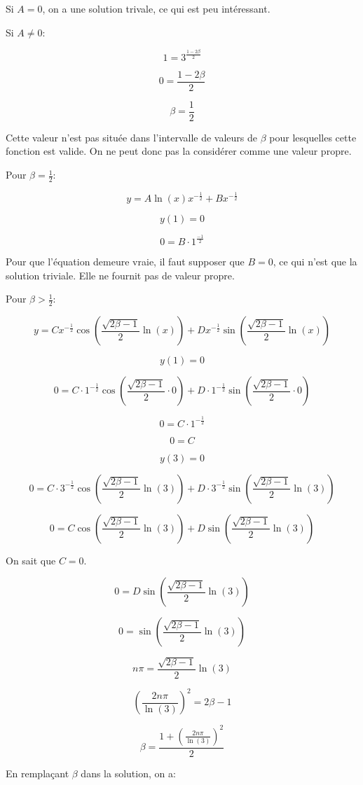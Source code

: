\documentclass{article}
\begin{document}
Si $A = 0$, on a une solution trivale, ce qui est peu intéressant.

Si $A \neq 0$:

$$1 = 3^{\frac{1 - 2\beta}{2}}  $$

$$0 = \frac{1 - 2\beta}{2}  $$

$$\beta = \frac{1}{2}$$

Cette valeur n'est pas située dans l'intervalle de valeurs de $\beta$ pour lesquelles cette fonction est valide. On ne peut donc pas la considérer comme une valeur propre.

Pour $\beta = \frac{1}{2}$:

$$y = A\ln(x)x^{-\frac{1}{2}} + Bx^{-\frac{1}{2}}$$

$$y(1) = 0$$

$$0 =  B\cdot 1^{\frac{-1}{2}}$$

Pour que l'équation demeure vraie, il faut supposer que $B = 0$, ce qui n'est que la solution triviale. Elle ne fournit pas de valeur propre.

Pour $\beta > \frac{1}{2}$:

$$y = C x^{-\frac{1}{2}}\cos(\frac{\sqrt{ 2\beta-1}}{2}\ln(x)) + D x^{-\frac{1}{2}}\sin(\frac{\sqrt{2\beta-1}}{2}\ln(x))$$

$$y(1) = 0$$

$$ 0 = C\cdot 1^{-\frac{1}{2}}\cos(\frac{\sqrt{2\beta-1}}{2}\cdot 0) + D\cdot 1^{-\frac{1}{2}}\sin(\frac{\sqrt{ 2\beta-1}}{2}\cdot 0)$$

$$ 0 = C\cdot 1^{-\frac{1}{2}}$$

$$ 0 = C $$

$$y(3) = 0$$

$$0 = C \cdot 3^{-\frac{1}{2}}\cos(\frac{\sqrt{ 2\beta-1}}{2}\ln(3)) + D\cdot 3^{-\frac{1}{2}}\sin(\frac{\sqrt{2\beta-1}}{2}\ln(3))$$

$$0 = C \cos(\frac{\sqrt{2\beta-1}}{2}\ln(3)) + D\sin(\frac{\sqrt{2\beta-1}}{2}\ln(3))$$

On sait que $ C = 0 $.

$$0 = D\sin(\frac{\sqrt{2\beta-1}}{2}\ln(3))$$

$$0 = \sin(\frac{\sqrt{2\beta-1}}{2}\ln(3))$$

$$ n\pi = \frac{\sqrt{2\beta-1}}{2}\ln(3)$$

$$ (\frac{2n\pi}{\ln(3)})^2 = 2\beta-1$$

$$ \beta = \frac{1 + (\frac{2n\pi}{\ln(3)})^2}{2} $$

En remplaçant $\beta$ dans la solution, on a:
\end{document}
